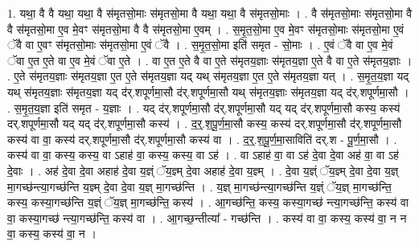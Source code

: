 \documentclass[17pt]{extarticle}
\begin{document}
1. यथा॒ वै वै यथा॒ यथा॒ वै स॑मृतसो॒माः स॑मृतसो॒मा वै यथा॒ यथा॒ वै स॑मृतसो॒माः । . वै स॑मृतसो॒माः स॑मृतसो॒मा वै वै स॑मृतसो॒मा ए॒व मे॒वꣳ स॑मृतसो॒मा वै वै स॑मृतसो॒मा ए॒वम् । . स॒मृ॒त॒सो॒मा ए॒व मे॒वꣳ स॑मृतसो॒माः स॑मृतसो॒मा ए॒वं ॅवै वा ए॒वꣳ स॑मृतसो॒माः स॑मृतसो॒मा ए॒वं ॅवै । . स॒मृ॒त॒सो॒मा इति॑ समृत - सो॒माः । . ए॒वं ॅवै वा ए॒व मे॒वं ॅवा ए॒त ए॒ते वा ए॒व मे॒वं ॅवा ए॒ते । . वा ए॒त ए॒ते वै वा ए॒ते स॑मृतय॒ज्ञाः स॑मृतय॒ज्ञा ए॒ते वै वा ए॒ते स॑मृतय॒ज्ञाः । . ए॒ते स॑मृतय॒ज्ञाः स॑मृतय॒ज्ञा ए॒त ए॒ते स॑मृतय॒ज्ञा यद् यथ् स॑मृतय॒ज्ञा ए॒त ए॒ते स॑मृतय॒ज्ञा यत् । . स॒मृ॒त॒य॒ज्ञा यद् यथ् स॑मृतय॒ज्ञाः स॑मृतय॒ज्ञा यद् द॑र्.शपूर्णमा॒सौ द॑र्.शपूर्णमा॒सौ यथ् स॑मृतय॒ज्ञाः स॑मृतय॒ज्ञा यद् द॑र्.शपूर्णमा॒सौ । . स॒मृ॒त॒य॒ज्ञा इति॑ समृत - य॒ज्ञाः । . यद् द॑र्.शपूर्णमा॒सौ द॑र्.शपूर्णमा॒सौ यद् यद् द॑र्.शपूर्णमा॒सौ कस्य॒ कस्य॑ दर्.शपूर्णमा॒सौ यद् यद् द॑र्.शपूर्णमा॒सौ कस्य॑ । . द॒र्॒.श॒पू॒र्ण॒मा॒सौ कस्य॒ कस्य॑ दर्.शपूर्णमा॒सौ द॑र्.शपूर्णमा॒सौ कस्य॑ वा वा॒ कस्य॑ दर्.शपूर्णमा॒सौ द॑र्.शपूर्णमा॒सौ कस्य॑ वा । . द॒र्॒.श॒पू॒र्ण॒मा॒साविति॑ दर्.श - पू॒र्ण॒मा॒सौ । . कस्य॑ वा वा॒ कस्य॒ कस्य॒ वा ऽहाह॑ वा॒ कस्य॒ कस्य॒ वा ऽह॑ । . वा ऽहाह॑ वा॒ वा ऽह॑ दे॒वा दे॒वा अह॑ वा॒ वा ऽह॑ दे॒वाः । . अह॑ दे॒वा दे॒वा अहाह॑ दे॒वा य॒ज्ञ्ं ॅय॒ज्ञ्म् दे॒वा अहाह॑ दे॒वा य॒ज्ञ्म् । . दे॒वा य॒ज्ञ्ं ॅय॒ज्ञ्म् दे॒वा दे॒वा य॒ज्ञ् मा॒गच्छ॑न्त्या॒गच्छ॑न्ति य॒ज्ञ्म् दे॒वा दे॒वा य॒ज्ञ् मा॒गच्छ॑न्ति । . य॒ज्ञ् मा॒गच्छ॑न्त्या॒गच्छ॑न्ति य॒ज्ञ्ं ॅय॒ज्ञ् मा॒गच्छ॑न्ति॒ कस्य॒ कस्या॒गच्छ॑न्ति य॒ज्ञ्ं ॅय॒ज्ञ् मा॒गच्छ॑न्ति॒ कस्य॑ । . आ॒गच्छ॑न्ति॒ कस्य॒ कस्या॒गच्छ॑ न्त्या॒गच्छ॑न्ति॒ कस्य॑ वा वा॒ कस्या॒गच्छ॑ न्त्या॒गच्छ॑न्ति॒ कस्य॑ वा । . आ॒गच्छ॒न्तीत्या᳚ - गच्छ॑न्ति । . कस्य॑ वा वा॒ कस्य॒ कस्य॑ वा॒ न न वा॒ कस्य॒ कस्य॑ वा॒ न । \newline
\end{document}
